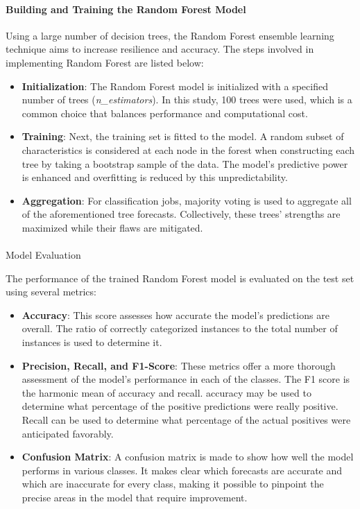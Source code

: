 \documentclass[conference]{IEEEtran}
\begin{document}
\paragraph{Building and Training the Random Forest Model}

Using a large number of decision trees, the Random Forest ensemble learning technique aims to increase resilience and accuracy. The steps involved in implementing Random Forest are listed below:


\begin{itemize}
    \item \textbf{Initialization}: The Random Forest model is initialized with a specified number of trees (\textit{n\_estimators}). In this study, 100 trees were used, which is a common choice that balances performance and computational cost.
    \item \textbf{Training}: Next, the training set is fitted to the model. A random subset of characteristics is considered at each node in the forest when constructing each tree by taking a bootstrap sample of the data. The model's predictive power is enhanced and overfitting is reduced by this unpredictability.

    \item \textbf{Aggregation}: For classification jobs, majority voting is used to aggregate all of the aforementioned tree forecasts. Collectively, these trees' strengths are maximized while their flaws are mitigated.

\end{itemize}

\paragraph{}{Model Evaluation}

The performance of the trained Random Forest model is evaluated on the test set using several metrics:

\begin{itemize}
    \item \textbf{Accuracy}: This score assesses how accurate the model's predictions are overall. The ratio of correctly categorized instances to the total number of instances is used to determine it.

    \item \textbf{Precision, Recall, and F1-Score}: These metrics offer a more thorough assessment of the model's performance in each of the classes. The F1 score is the harmonic mean of accuracy and recall. accuracy may be used to determine what percentage of the positive predictions were really positive. Recall can be used to determine what percentage of the actual positives were anticipated favorably.


    \item \textbf{Confusion Matrix}: A confusion matrix is made to show how well the model performs in various classes. It makes clear which forecasts are accurate and which are inaccurate for every class, making it possible to pinpoint the precise areas in the model that require improvement.

\end{itemize}
\end{document}
